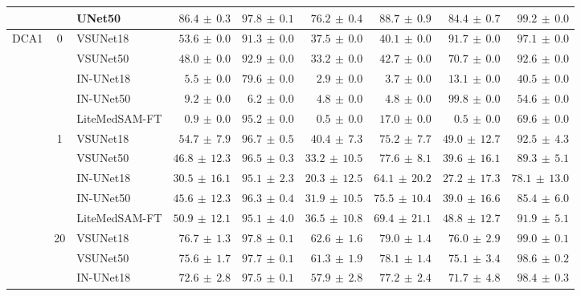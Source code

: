 \documentclass[%
reprint,
nofootinbib,
 amsmath,amssymb,
aps,
superscriptaddress,
showkeys,
longbibliography
]{revtex4-1}
\begin{document}
\begin{table}[t]
\begin{tabular}{l c l r r r r r r}
 &  & UNet50 & $86.4 \,\pm\, 0.3$ & $97.8 \,\pm\, 0.1$ & $76.2 \,\pm\, 0.4$ & $88.7 \,\pm\, 0.9$ & $84.4 \,\pm\, 0.7$ & $99.2 \,\pm\, 0.0$ \\
\hline
\multirow{17}{*}{DCA1} & \multirow{5}{*}{0} & VSUNet18 & $\mathbf{53.6} \,\pm\, 0.0$ & $91.3 \,\pm\, 0.0$ & $37.5 \,\pm\, 0.0$ & $40.1 \,\pm\, 0.0$ & $91.7 \,\pm\, 0.0$ & $97.1 \,\pm\, 0.0$ \\
 &  & VSUNet50 & $48.0 \,\pm\, 0.0$ & $92.9 \,\pm\, 0.0$ & $33.2 \,\pm\, 0.0$ & $42.7 \,\pm\, 0.0$ & $70.7 \,\pm\, 0.0$ & $92.6 \,\pm\, 0.0$ \\
 &  & IN-UNet18 & $5.5 \,\pm\, 0.0$ & $79.6 \,\pm\, 0.0$ & $2.9 \,\pm\, 0.0$ & $3.7 \,\pm\, 0.0$ & $13.1 \,\pm\, 0.0$ & $40.5 \,\pm\, 0.0$ \\
 &  & IN-UNet50 & $9.2 \,\pm\, 0.0$ & $6.2 \,\pm\, 0.0$ & $4.8 \,\pm\, 0.0$ & $4.8 \,\pm\, 0.0$ & $99.8 \,\pm\, 0.0$ & $54.6 \,\pm\, 0.0$ \\
 &  & LiteMedSAM-FT & $0.9 \,\pm\, 0.0$ & $95.2 \,\pm\, 0.0$ & $0.5 \,\pm\, 0.0$ & $17.0 \,\pm\, 0.0$ & $0.5 \,\pm\, 0.0$ & $69.6 \,\pm\, 0.0$ \\
\cline{2-9}
 & \multirow{5}{*}{1} & VSUNet18 & $\mathbf{54.7} \,\pm\, 7.9$ & $96.7 \,\pm\, 0.5$ & $40.4 \,\pm\, 7.3$ & $75.2 \,\pm\, 7.7$ & $49.0 \,\pm\, 12.7$ & $92.5 \,\pm\, 4.3$ \\
 &  & VSUNet50 & $46.8 \,\pm\, 12.3$ & $96.5 \,\pm\, 0.3$ & $33.2 \,\pm\, 10.5$ & $77.6 \,\pm\, 8.1$ & $39.6 \,\pm\, 16.1$ & $89.3 \,\pm\, 5.1$ \\
 &  & IN-UNet18 & $30.5 \,\pm\, 16.1$ & $95.1 \,\pm\, 2.3$ & $20.3 \,\pm\, 12.5$ & $64.1 \,\pm\, 20.2$ & $27.2 \,\pm\, 17.3$ & $78.1 \,\pm\, 13.0$ \\
 &  & IN-UNet50 & $45.6 \,\pm\, 12.3$ & $96.3 \,\pm\, 0.4$ & $31.9 \,\pm\, 10.5$ & $75.5 \,\pm\, 10.4$ & $39.0 \,\pm\, 16.6$ & $85.4 \,\pm\, 6.0$ \\
 &  & LiteMedSAM-FT & $50.9 \,\pm\, 12.1$ & $95.1 \,\pm\, 4.0$ & $36.5 \,\pm\, 10.8$ & $69.4 \,\pm\, 21.1$ & $48.8 \,\pm\, 12.7$ & $91.9 \,\pm\, 5.1$ \\
\cline{2-9}
 & \multirow{7}{*}{20} & VSUNet18 & $76.7 \,\pm\, 1.3$ & $97.8 \,\pm\, 0.1$ & $62.6 \,\pm\, 1.6$ & $79.0 \,\pm\, 1.4$ & $76.0 \,\pm\, 2.9$ & $99.0 \,\pm\, 0.1$ \\
 &  & VSUNet50 & $75.6 \,\pm\, 1.7$ & $97.7 \,\pm\, 0.1$ & $61.3 \,\pm\, 1.9$ & $78.1 \,\pm\, 1.4$ & $75.1 \,\pm\, 3.4$ & $98.6 \,\pm\, 0.2$ \\
 &  & IN-UNet18 & $72.6 \,\pm\, 2.8$ & $97.5 \,\pm\, 0.1$ & $57.9 \,\pm\, 2.8$ & $77.2 \,\pm\, 2.4$ & $71.7 \,\pm\, 4.8$ & $98.4 \,\pm\, 0.3$ \\

\end{tabular}
\end{table}
\end{document}
